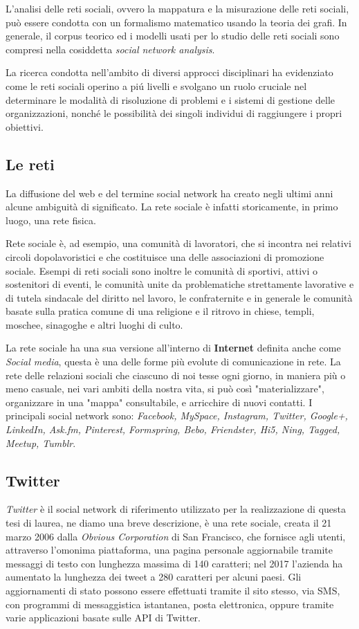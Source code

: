L'analisi delle reti sociali, ovvero la mappatura e la misurazione delle reti sociali, può essere condotta con un formalismo matematico usando la teoria dei grafi. In generale, il corpus teorico ed i modelli usati per lo studio delle reti sociali sono compresi nella cosiddetta \textit{social network analysis}.

La ricerca condotta nell'ambito di diversi approcci disciplinari ha evidenziato come le reti sociali operino a pi\'u livelli e svolgano un ruolo cruciale nel determinare le modalità di risoluzione di problemi e i sistemi di gestione delle organizzazioni, nonché le possibilità dei singoli individui di raggiungere i propri obiettivi.

\subsection{Le reti}
La diffusione del web e del termine social network ha creato negli ultimi anni alcune ambiguità di significato. La rete sociale è infatti storicamente, in primo luogo, una rete fisica.

Rete sociale è, ad esempio, una comunità di lavoratori, che si incontra nei relativi circoli dopolavoristici e che costituisce una delle associazioni di promozione sociale. Esempi di reti sociali sono inoltre le comunità di sportivi, attivi o sostenitori di eventi, le comunità unite da problematiche strettamente lavorative e di tutela sindacale del diritto nel lavoro, le confraternite e in generale le comunità basate sulla pratica comune di una religione e il ritrovo in chiese, templi, moschee, sinagoghe e altri luoghi di culto.

La rete sociale ha una sua versione all'interno di \textbf{Internet} definita anche come \textit{Social media}, questa è una delle forme più evolute di comunicazione in rete. La rete delle relazioni sociali che ciascuno di noi tesse ogni giorno, in maniera più o meno casuale, nei vari ambiti della nostra vita, si può così "materializzare", organizzare in una "mappa" consultabile, e arricchire di nuovi contatti. I principali social network sono: \textit{Facebook, MySpace, Instagram, Twitter, Google+, LinkedIn, Ask.fm, Pinterest, Formspring, Bebo, Friendster, Hi5, Ning, Tagged, Meetup, Tumblr}.

\subsection{Twitter}
\textit{Twitter} è il social network di riferimento utilizzato per la realizzazione di questa tesi di laurea, ne diamo una breve descrizione, è una rete sociale, creata il 21 marzo 2006 dalla \textit{Obvious Corporation} di San Francisco, che fornisce agli utenti, attraverso l'omonima piattaforma, una pagina personale aggiornabile tramite messaggi di testo con lunghezza massima di 140 caratteri; nel 2017 l'azienda ha aumentato la lunghezza dei tweet a 280 caratteri per alcuni paesi. Gli aggiornamenti di stato possono essere effettuati tramite il sito stesso, via SMS, con programmi di messaggistica istantanea, posta elettronica, oppure tramite varie applicazioni basate sulle API di Twitter. 

